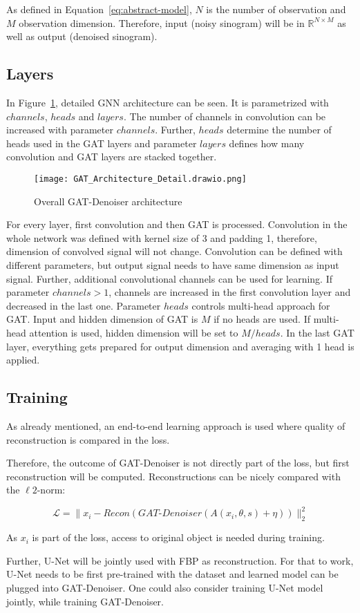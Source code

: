 As defined in Equation~\ref{eq:abstract-model}, $N$ is the number of observation and
$M$ observation dimension. 
Therefore, input (noisy sinogram) will be in $\mathbb{R}^{N \times M}$ as well as output (denoised sinogram). 

\subsection{Layers}
In Figure~\ref{fig:architecture-detailed}, detailed GNN architecture can be seen.
It is parametrized with $channels$, $heads$ and $layers$. 
The number of channels in convolution can be increased with parameter $channels$.
Further, $heads$ determine the number of heads used in the GAT layers and parameter 
$layers$ defines how many convolution and GAT layers are stacked together.


\begin{figure}[H]
  \centering
  \label{fig:architecture-detailed}
  \texttt{[image: GAT\_Architecture\_Detail.drawio.png]}
  \caption{Overall GAT-Denoiser architecture}
\end{figure}


For every layer, first convolution and then GAT is processed. 
Convolution in the whole network was defined with kernel size of 3 and padding 1,
therefore, dimension of convolved signal will not change. 
Convolution can be defined with different parameters, but output signal needs to have 
same dimension as input signal.
Further, additional convolutional channels can be used for learning.
If parameter $channels > 1$, channels are increased in the first convolution layer 
and decreased in the last one.
Parameter $heads$ controls multi-head approach for GAT. Input and hidden dimension
of GAT is $M$ if no heads are used.
If multi-head attention is used, hidden dimension will be set to $M / heads$.
In the last GAT layer, everything gets prepared for output dimension and 
averaging with 1 head is applied.

\subsection{Training}
\label{sec:contr_training}
As already mentioned, an end-to-end learning approach is used where quality of reconstruction is 
compared in the loss.

Therefore, the outcome of GAT-Denoiser is not directly part of the loss, but first reconstruction will be computed.
Reconstructions can be nicely compared with the $\ell2$-norm:

\begin{equation}
  \label{eq:loss_reco}
  \mathcal{L} = \parallel x_i - \textit{Recon} ( \textit{GAT-Denoiser}(A(x_i, \theta, s) + \eta)) \parallel ^2_2
\end{equation}

As $x_i$ is part of the loss, access to original object is needed during training.

Further, U-Net will be jointly used with FBP as reconstruction. For that to work, U-Net needs to be 
first pre-trained with the dataset and learned model can be plugged into GAT-Denoiser.
One could also consider training U-Net model jointly, while training GAT-Denoiser.
